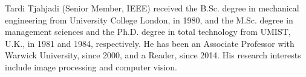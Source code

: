 \documentclass[journal]{IEEEtran}
\begin{document}
\vspace{1 mm}
\begin{IEEEbiography}{Tardi Tjahjadi}  (Senior Member, IEEE) received the B.Sc. degree in mechanical engineering from University College London, in 1980, and the M.Sc. degree in management sciences and the Ph.D. degree in total technology from UMIST, U.K., in 1981 and 1984, respectively. He has been an Associate Professor with Warwick University, since 2000, and a Reader, since 2014. His research interests include image processing and computer vision.
\end{IEEEbiography}




\end{document}
